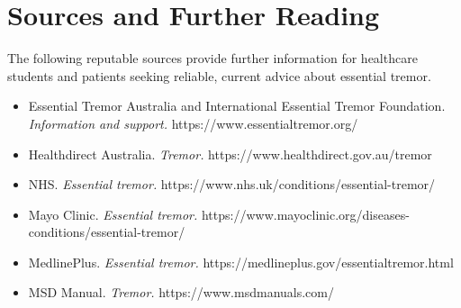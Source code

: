 \section*{Sources and Further Reading}
The following reputable sources provide further information for healthcare students and patients seeking reliable, current advice about essential tremor.
\begin{itemize}
    \item Essential Tremor Australia and International Essential Tremor Foundation. \textit{Information and support.} https://www.essentialtremor.org/
    \item Healthdirect Australia. \textit{Tremor.} https://www.healthdirect.gov.au/tremor
    \item NHS. \textit{Essential tremor.} https://www.nhs.uk/conditions/essential-tremor/
    \item Mayo Clinic. \textit{Essential tremor.} https://www.mayoclinic.org/diseases-conditions/essential-tremor/
    \item MedlinePlus. \textit{Essential tremor.} https://medlineplus.gov/essentialtremor.html
    \item MSD Manual. \textit{Tremor.} https://www.msdmanuals.com/
\end{itemize}
